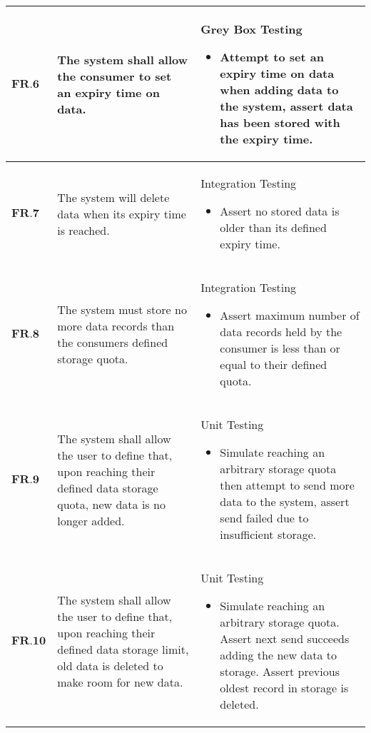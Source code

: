 \begin{longtable}[H]{| p{1.5cm} | p{6cm} | p{9cm}| }
        $\textbf{FR.6} $ & The system shall allow the consumer to set an expiry time on data.                                                                             & Grey Box Testing\begin{itemize} \item Attempt to set an expiry time on data when adding data to the system, assert data has been stored with the expiry time.\end{itemize}                                                                                                         \\ \hline
       $ \textbf{FR.7} $ & The system will delete data when its expiry time is reached.                                                                                   & Integration Testing\begin{itemize} \item Assert no stored data is older than its defined expiry time.\end{itemize}                                                                                                                                                                  \\ \hline
        $\textbf{FR.8}$  & The system must store no more data records than the consumers defined storage quota.                                                           & Integration Testing\begin{itemize} \item Assert maximum number of data records held by the consumer is less than or equal to their defined quota.\end{itemize}                                                                                                                  \\ \hline
        $\textbf{FR.9} $ & The system shall allow the user to define that, upon reaching their defined data storage quota, new data is no longer added.                   & Unit Testing\begin{itemize} \item Simulate reaching an arbitrary storage quota then attempt to send more data to the system, assert send failed due to insufficient storage.\end{itemize}                                                                                       \\ \hline
    	$\textbf{FR.10}$ & The system shall allow the user to define that, upon reaching their defined data storage limit, old data is deleted to make room for new data. & Unit Testing\begin{itemize} \item Simulate reaching an arbitrary storage quota.  Assert next send succeeds adding the new data to storage. Assert previous oldest record in storage is deleted.\end{itemize} \\ \hline
\end{longtable}

